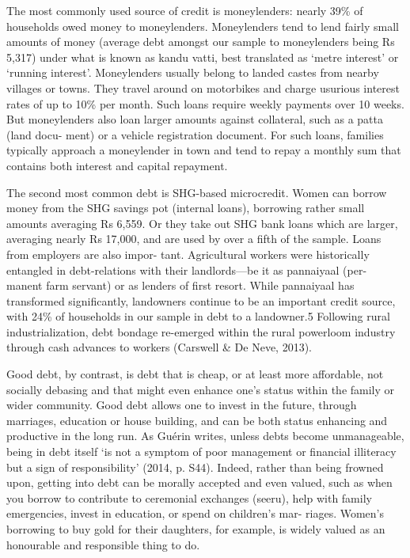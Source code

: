 \documentclass[a4paper, 11pt, onecolumn]{article}
\begin{document}
\cite{Carswell2021}

The most commonly used source of credit is moneylenders: nearly 39\% of
households owed money to moneylenders. Moneylenders tend to lend fairly small amounts of money (average debt
amongst our sample to moneylenders being Rs 5,317) under what is known as kandu vatti, best translated as ‘metre
interest’ or ‘running interest’. Moneylenders usually belong to landed castes from nearby villages or towns. They
travel around on motorbikes and charge usurious interest rates of up to 10\% per month. Such loans require weekly
payments over 10 weeks. But moneylenders also loan larger amounts against collateral, such as a patta (land docu-
ment) or a vehicle registration document. For such loans, families typically approach a moneylender in town and tend
to repay a monthly sum that contains both interest and capital repayment.

The second most common debt is SHG-based microcredit. Women can borrow money from the SHG savings
pot (internal loans), borrowing rather small amounts averaging Rs 6,559. Or they take out SHG bank loans which are
larger, averaging nearly Rs 17,000, and are used by over a fifth of the sample. Loans from employers are also impor-
tant. Agricultural workers were historically entangled in debt-relations with their landlords—be it as pannaiyaal (per-
manent farm servant) or as lenders of first resort. While pannaiyaal has transformed significantly, landowners
continue to be an important credit source, with 24\% of households in our sample in debt to a landowner.5 Following
rural industrialization, debt bondage re-emerged within the rural powerloom industry through cash advances to
workers (Carswell \& De Neve, 2013). 

Good debt, by contrast, is debt that is cheap, or at least more affordable, not socially debasing and that
might even enhance one's status within the family or wider community. Good debt allows one to invest in the
future, through marriages, education or house building, and can be both status enhancing and productive in the
long run. As Guérin writes, unless debts become unmanageable, being in debt itself ‘is not a symptom of poor
management or financial illiteracy but a sign of responsibility’ (2014, p. S44). Indeed, rather than being frowned
upon, getting into debt can be morally accepted and even valued, such as when you borrow to contribute to
ceremonial exchanges (seeru), help with family emergencies, invest in education, or spend on children's mar-
riages. Women's borrowing to buy gold for their daughters, for example, is widely valued as an honourable and
responsible thing to do.
\end{document}
